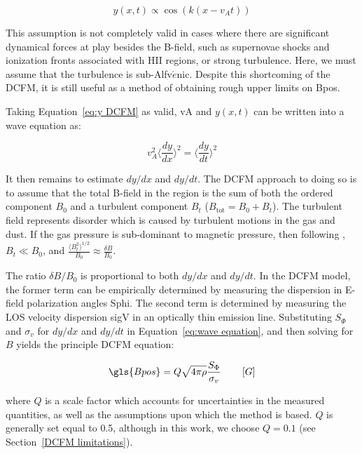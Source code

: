 \begin{equation}\label{eq:y DCFM}
  y(x,t) \propto \mathrm{\cos}{\left( k(x - v_{A}t) \right)}
\end{equation}

This assumption is not completely valid in cases where there are significant dynamical forces at play besides the B-field, such as supernovae shocks and ionization fronts associated with HII regions, or strong turbulence. Here, we must assume that the turbulence is sub-Alfv$\acute{e}$nic. Despite this shortcoming of the DCFM, it is still useful as a method of obtaining rough upper limits on \gls{Bpos}.

Taking Equation~\ref{eq:y DCFM} as valid, \gls{vA} and $y(x, t)$ can be written into a wave equation as:

\begin{equation}\label{eq:wave equation}
  v_{A}^{2} \bigg \langle \frac{dy}{dx}  \bigg \rangle ^{2} = \bigg \langle \frac{dy}{dt}  \bigg \rangle ^{2}
\end{equation}

It then remains to estimate $dy/dx$ and $dy/dt$. The DCFM approach to doing so is to assume that the total B-field in the region is the sum of both the ordered component $B_{0}$ and a turbulent component $B_{t}$ ($B_{\mathrm{tot}} = B_{0} + B_{t}$). The turbulent field represents disorder which is caused by turbulent motions in the gas and dust. If the gas pressure is sub-dominant to magnetic pressure, then following \citet{hildebrand2009dispersion}, $B_{t} \ll B_{0}$, and $ \frac{\langle B_{t}^{2} \rangle ^{1/2}}{ B_{0} } \approx \frac{ \delta B }{ B_{0} }$.

The ratio $\delta B/ B_{0}$ is proportional to both $dy/dx$ and $dy/dt$. In the DCFM model, the former term can be empirically determined by measuring the dispersion in E-field polarization angles \gls{Sphi}. The second term is determined by measuring the LOS velocity dispersion \gls{sigV} in an optically thin emission line. Substituting $S_{\Phi}$ and $\sigma_{v}$ for $dy/dx$ and $dy/dt$ in Equation~\ref{eq:wave equation}, and then solving for $B$ yields the principle DCFM equation:

\begin{equation}\label{eq:DCFM 1}
    \gls{Bpos} = Q \sqrt{4 \pi \rho}\frac{S_{\Phi}}{\sigma_{v}} \qquad \left[ G \right]
\end{equation}

where $Q$ is a scale factor which accounts for uncertainties in the measured quantities, as well as the assumptions upon which the method is based. $Q$ is generally set equal to 0.5, although in this work, we choose $Q = 0.1$ (see Section~\ref{DCFM limitations}).

